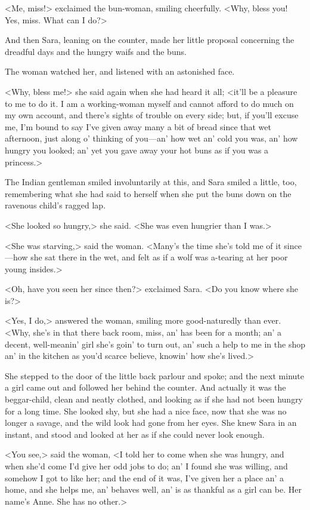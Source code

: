<Me, miss!> exclaimed the bun-woman, smiling cheerfully. <Why, bless you! Yes, miss. What can I do?>

And then Sara, leaning on the counter, made her little proposal concerning the dreadful days and the hungry waifs and the buns.

The woman watched her, and listened with an astonished face.

<Why, bless me!> she said again when she had heard it all; <it'll be a pleasure to me to do it. I am a working-woman myself and cannot afford to do much on my own account, and there's sights of trouble on every side; but, if you'll excuse me, I'm bound to say I've given away many a bit of bread since that wet afternoon, just along o' thinking of you—an' how wet an' cold you was, an' how hungry you looked; an' yet you gave away your hot buns as if you was a princess.>

The Indian gentleman smiled involuntarily at this, and Sara smiled a little, too, remembering what she had said to herself when she put the buns down on the ravenous child's ragged lap.

<She looked so hungry,> she said. <She was even hungrier than I was.>

<She was starving,> said the woman. <Many's the time she's told me of it since—how she sat there in the wet, and felt as if a wolf was a-tearing at her poor young insides.>

<Oh, have you seen her since then?> exclaimed Sara. <Do you know where she is?>

<Yes, I do,> answered the woman, smiling more good-naturedly than ever. <Why, she's in that there back room, miss, an' has been for a month; an' a decent, well-meanin' girl she's goin' to turn out, an' such a help to me in the shop an' in the kitchen as you'd scarce believe, knowin' how she's lived.>

She stepped to the door of the little back parlour and spoke; and the next minute a girl came out and followed her behind the counter. And actually it was the beggar-child, clean and neatly clothed, and looking as if she had not been hungry for a long time. She looked shy, but she had a nice face, now that she was no longer a savage, and the wild look had gone from her eyes. She knew Sara in an instant, and stood and looked at her as if she could never look enough.

<You see,> said the woman, <I told her to come when she was hungry, and when she'd come I'd give her odd jobs to do; an' I found she was willing, and somehow I got to like her; and the end of it was, I've given her a place an' a home, and she helps me, an' behaves well, an' is as thankful as a girl can be. Her name's Anne. She has no other.>


